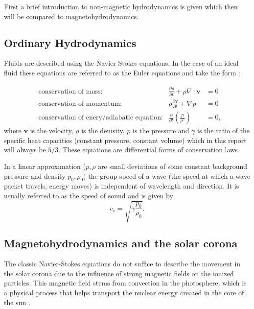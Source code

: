 \documentclass[a4paper]{article}
\begin{document}
First a brief introduction to non-magnetic hydrodynamics is given which then will be compared to magnetohydrodynamics.

\subsection{Ordinary Hydrodynamics} \label{sec:ordinary_hydrodynamics}

Fluids are described using the Navier Stokes equations. In the case of an ideal fluid these equations are referred to as the Euler equations and take the form \cite[section 1.3]{acheson1990}:

\begin{align*}
	&\text{conservation of mass:} &\frac{\partial \rho}{\partial t} + \rho \nabla \cdot \mathbf v &=  0 \\
				    &\text{conservation of momentum:} &\rho \frac{\partial \mathbf v}{\partial t} + \nabla p &= 0\\
				    &\text{conservation of enery/adiabatic equation:} &\frac{\partial }{\partial t} \left( \frac{p}{\rho^{\gamma}} \right)  &= 0
,\end{align*}
where $\mathbf v$ is the velocity,  $\rho$ is the denisity, $p$ is the pressure and $\gamma$ is the ratio of the specific heat capacities (constant pressure, constant volume) which in this report will always be $5 / 3$. 
These equations are differential forms of conservation laws. 

In a linear approximation ($p, \rho$ are small deviations of some constant background pressure and density $p_0, \rho_0$) the group speed of a wave (the speed at which a wave packet travels, energy moves) is independent of wavelength and direction. It is usually referred to as the speed of sound and is given by\cite[section 3.6]{acheson1990} \[
c_s = \sqrt{\gamma \frac{p_0}{\rho_0}} 
.\] 

\subsection{Magnetohydrodynamics and the solar corona} \label{sec:magnetohydrodynamics_and_the_solar_corona}
The classic Navier-Stokes equations do not suffice to describe the movement in the solar corona due to the influence of strong magnetic fields on the ionized particles. This magnetic field stems from convection in the photosphere, which is a physical process that helps transport the nuclear energy created in the core of the sun \cite{brun2017magnetism}.\\
\end{document}
